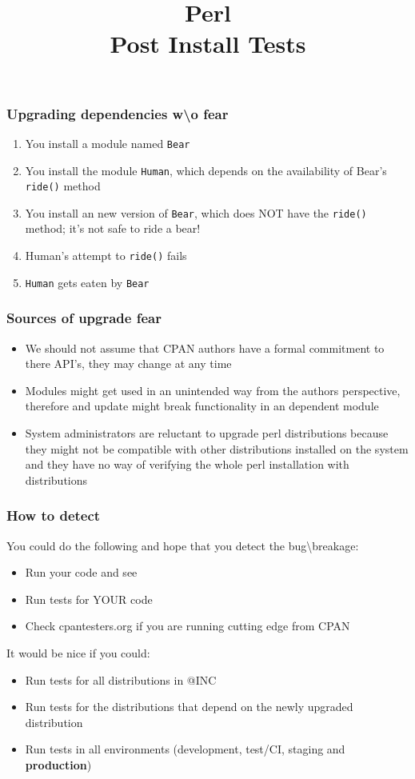 \documentclass[10pt]{beamer}
\title{Perl \\ Post Install Tests}
\begin{document}
\begin{frame}
\titlepage
\end{frame}


\begin{frame}[fragile]
\frametitle{Upgrading dependencies w\textbackslash o fear}
\begin{enumerate}
  \item You install a module named \verb|Bear|
  \item You install the module \verb|Human|, which depends on the availability of Bear's \verb|ride()| method
  \item You install an new version of \verb|Bear|, which does NOT have the \verb|ride()| method; it's not safe to ride a bear!
  \item Human's attempt to \verb|ride()| fails
  \item \verb|Human| gets eaten by \verb|Bear|
\end{enumerate}
\end{frame}

\begin{frame}
\frametitle{Sources of upgrade fear}
\begin{itemize}
\item We should not assume that CPAN authors have a formal commitment to there API's, they may change at any time
\item Modules might get used in an unintended way from the authors perspective, therefore and update might break functionality in an dependent module
\item System administrators are reluctant to upgrade perl distributions because they might not be compatible with other distributions installed on the system and they have no way of verifying the whole perl installation with distributions
\end{itemize}
\end{frame}

\begin{frame}
\frametitle{How to detect}
You could do the following and hope that you detect the bug\textbackslash breakage:
\begin{itemize}
\item Run your code and see
\item Run tests for YOUR code
\item Check cpantesters.org if you are running cutting edge from CPAN
\end{itemize}
\vspace{5 mm}
It would be nice if you could:
\begin{itemize}
\item Run tests for all distributions in @INC 
\item Run tests for the distributions that depend on the newly upgraded distribution
\item Run tests in all environments (development, test/CI, staging and {\bf production})
\end{itemize}
\end{frame}
\end{document}
